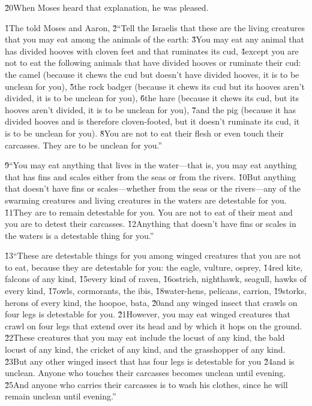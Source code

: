 \v{20}When Moses heard that explanation, he was pleased.

\v{1}The  told Moses and Aaron, \v{2}``Tell the Israelis that these are the living creatures that you may eat among the animals of the earth: \v{3}You may eat any animal that has divided hooves with cloven feet and that ruminates its cud, \v{4}except you are not to eat the following animals that have divided hooves or ruminate their cud: the camel (because it chews the cud but doesn't have divided hooves, it is to be unclean for you), \v{5}the rock badger (because it chews its cud but its hooves aren't divided, it is to be unclean for you), \v{6}the hare (because it chews its cud, but its hooves aren't divided, it is to be unclean for you), \v{7}and the pig (because it has divided hooves and is therefore cloven-footed, but it doesn't ruminate its cud, it is to be unclean for you). \v{8}You are not to eat their flesh or even touch their carcasses. They are to be unclean for you.''

\v{9}``You may eat anything that lives in the water---that is, you may eat anything that has fins and scales either from the seas or from the rivers. \v{10}But anything that doesn't have fins or scales---whether from the seas or the rivers---any of the swarming creatures and living creatures in the waters are detestable for you. \v{11}They are to remain detestable for you. You are not to eat of their meat and you are to detest their carcasses. \v{12}Anything that doesn't have fins or scales in the waters is a detestable thing for you.''

\v{13}``These are detestable things for you among winged creatures that you are not to eat, because they are detestable for you: the eagle, vulture, osprey, \v{14}red kite, falcons of any kind, \v{15}every kind of raven, \v{16}ostrich, nighthawk, seagull, hawks of every kind, \v{17}owls, cormorants, the ibis, \v{18}water-hens, pelicans, carrion, \v{19}storks, herons of every kind, the hoopoe, bata, \v{20}and any winged insect that crawls on four legs is detestable for you. \v{21}However, you may eat winged creatures that crawl on four legs that extend over its head and by which it hops on the ground. \v{22}These creatures that you may eat include the locust of any kind, the bald locust of any kind, the cricket of any kind, and the grasshopper of any kind. \v{23}But any other winged insect that has four legs is detestable for you \v{24}and is unclean. Anyone who touches their carcasses becomes unclean until evening. \v{25}And anyone who carries their carcasses is to wash his clothes, since he will remain unclean until evening.''

